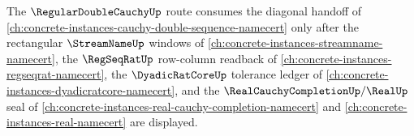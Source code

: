 The $\RegularDoubleCauchyUp$ route consumes the diagonal handoff of \autoref{ch:concrete-instances-cauchy-double-sequence-namecert} only after the rectangular $\StreamNameUp$ windows of \autoref{ch:concrete-instances-streamname-namecert}, the $\RegSeqRatUp$ row-column readback of \autoref{ch:concrete-instances-regseqrat-namecert}, the $\DyadicRatCoreUp$ tolerance ledger of \autoref{ch:concrete-instances-dyadicratcore-namecert}, and the $\RealCauchyCompletionUp/\RealUp$ seal of \autoref{ch:concrete-instances-real-cauchy-completion-namecert} and \autoref{ch:concrete-instances-real-namecert} are displayed.
